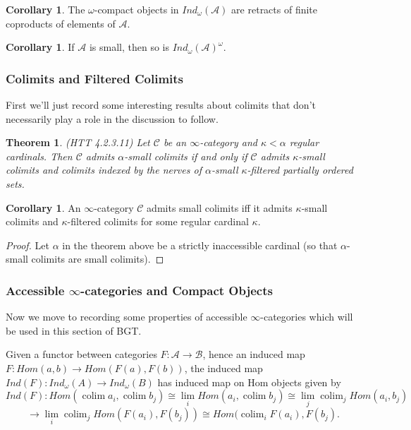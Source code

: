 \documentclass[letterpaper]{article}
\newtheorem{theorem}{Theorem}
\theoremstyle{definition}
\newtheorem{corollary}[lemma]{Corollary}
\newcommand{\mc}{\mathcal}
\DeclareMathOperator*{\colim}{colim}
\begin{document}
\begin{corollary}
The $\omega$-compact objects in $Ind_{\omega}(\mc A)$ are retracts of finite coproducts
of elements of $\mc A$.
\end{corollary}

\begin{corollary}
If $\mc A$ is small, then so is $Ind_{\omega}(\mc A)^{\omega}$.
\end{corollary}

\subsubsection{Colimits and Filtered Colimits}

First we'll just record some interesting results about colimits that
don't necessarily play a role in the discussion to follow.

\begin{theorem} (HTT 4.2.3.11)
Let $\mc C$ be an $\infty$-category and $\kappa < \alpha$ regular
cardinals. Then $\mc C$ admits $\alpha$-small colimits if and only if
$\mc C$ admits $\kappa$-small colimits and colimits indexed by the
nerves of $\alpha$-small $\kappa$-filtered partially ordered sets.
\end{theorem}

\begin{corollary}
An $\infty$-category $\mc C$ admits small colimits iff it admits
$\kappa$-small colimits and $\kappa$-filtered colimits for some
regular cardinal $\kappa$.
\end{corollary}


\begin{proof}
Let $\alpha$ in the theorem above be a strictly inaccessible cardinal
(so that $\alpha$-small colimits are small colimits).
\end{proof}

\subsubsection{Accessible $\infty$-categories and Compact Objects}

Now we move to recording some properties of accessible $\infty$-categories
which will be used in this section of BGT.

Given a functor between categories $F : \mc A \rightarrow \mc B$,
hence an induced map $F : Hom(a,b) \rightarrow Hom(F(a),F(b))$, the
induced map $Ind(F) : Ind_\omega(A) \rightarrow Ind_\omega(B)$ has
induced map on Hom objects given by 
\[
Ind(F) : Hom(\colim a_i,\colim
b_j) \cong \lim_i Hom(a_i,\colim b_j) \cong \lim_j \colim_j
Hom(a_i,b_j) 
\]
\[
\rightarrow \lim_i \colim_j Hom(F(a_i),F(b_j)) \cong
Hom(\colim_i F(a_i), F(b_j).
\]
\end{document}
